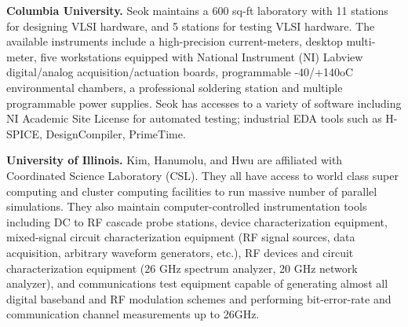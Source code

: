 \noindent
\textbf{Columbia University.} 
Seok maintains a 600 sq-ft laboratory with 11 stations for designing VLSI hardware, and 5 stations for testing VLSI hardware. 
The available instruments include a high-precision current-meters, desktop multi-meter, five workstations equipped with National Instrument (NI) Labview digital/analog acquisition/actuation boards, programmable -40/+140oC environmental chambers, a professional soldering station and multiple programmable power supplies. 
Seok has accesses to a variety of software including NI Academic Site License for automated testing; industrial EDA tools such as H-SPICE, DesignCompiler, PrimeTime. %

\vspace{3pt}
\noindent
\textbf{University of Illinois.}
Kim, Hanumolu, and Hwu are affiliated with Coordinated Science Laboratory (CSL). 
They all have access to world class super computing and cluster computing facilities to run massive number of parallel simulations. 
They also maintain computer-controlled instrumentation tools including DC to RF cascade probe stations, device characterization equipment, 
mixed-signal circuit characterization equipment (RF signal sources, data acquisition, arbitrary waveform generators, etc.), RF devices and circuit characterization equipment (26 GHz spectrum analyzer, 20 GHz network analyzer), and communications test equipment capable of generating almost all digital baseband and RF modulation schemes and performing bit-error-rate and communication channel measurements up to 26GHz. 

